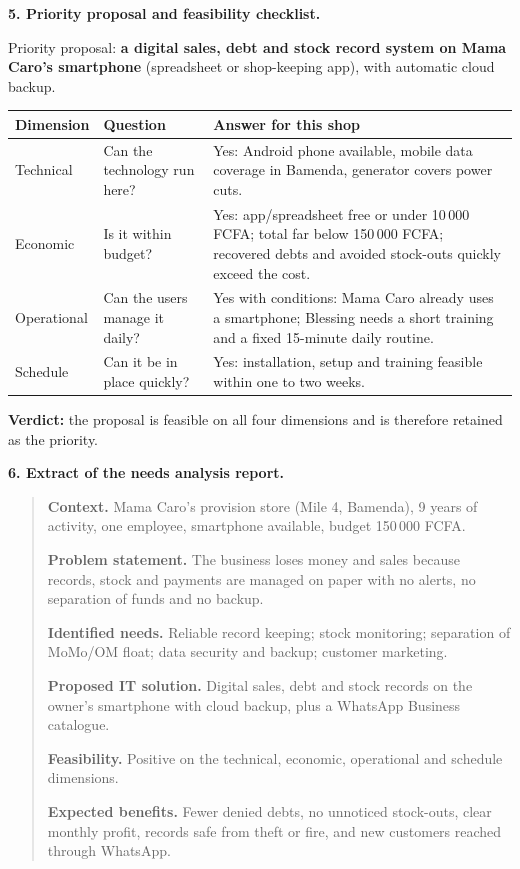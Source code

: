 \documentclass[11pt]{article}
\newcommand{\cle}[1]{{\popxbold\color{popdark}#1}}
\begin{document}
\begin{exoresolu}
\textbf{5. Priority proposal and feasibility checklist.}

Priority proposal: \textbf{a digital sales, debt and stock record system on Mama Caro's smartphone} (spreadsheet or shop-keeping app), with automatic cloud backup.

\begin{center}
\begin{tabularx}{\linewidth}{|l|X|X|}\hline
\rowcolor{popblueL} \textbf{Dimension} & \textbf{Question} & \textbf{Answer for this shop} \\ \hline
Technical & Can the technology run here? & Yes: Android phone available, mobile data coverage in Bamenda, generator covers power cuts. \\ \hline
Economic & Is it within budget? & Yes: app/spreadsheet free or under 10\,000 FCFA; total far below 150\,000 FCFA; recovered debts and avoided stock-outs quickly exceed the cost. \\ \hline
Operational & Can the users manage it daily? & Yes with conditions: Mama Caro already uses a smartphone; Blessing needs a short training and a fixed 15-minute daily routine. \\ \hline
Schedule & Can it be in place quickly? & Yes: installation, setup and training feasible within one to two weeks. \\ \hline
\end{tabularx}
\end{center}

\textbf{Verdict:} the proposal is \cle{feasible} on all four dimensions and is therefore retained as the priority.

\textbf{6. Extract of the needs analysis report.}

\begin{quote}
\textbf{Context.} Mama Caro's provision store (Mile 4, Bamenda), 9 years of activity, one employee, smartphone available, budget 150\,000 FCFA.\par
\textbf{Problem statement.} The business loses money and sales because records, stock and payments are managed on paper with no alerts, no separation of funds and no backup.\par
\textbf{Identified needs.} Reliable record keeping; stock monitoring; separation of MoMo/OM float; data security and backup; customer marketing.\par
\textbf{Proposed IT solution.} Digital sales, debt and stock records on the owner's smartphone with cloud backup, plus a WhatsApp Business catalogue.\par
\textbf{Feasibility.} Positive on the technical, economic, operational and schedule dimensions.\par
\textbf{Expected benefits.} Fewer denied debts, no unnoticed stock-outs, clear monthly profit, records safe from theft or fire, and new customers reached through WhatsApp.
\end{quote}


\end{exoresolu}
\end{document}
